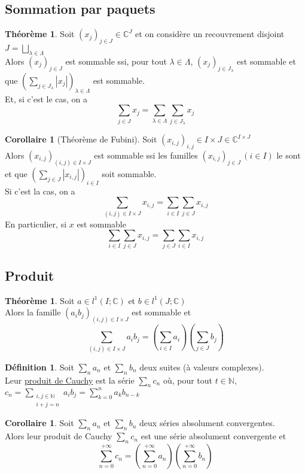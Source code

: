 \documentclass[10pt,a4paper]{article}
\theoremstyle{definition}
\newtheorem{theorem}[proposition]{Théorème}
\newtheorem{corollaire}[proposition]{Corollaire}
\newtheorem{definition}[proposition]{Définition}
\begin{document}
\subsection{Sommation par paquets}
\begin{theorem}
Soit $(x_j)_{j \in J} \in \mathbb{C}^J$ et on considère un recouvrement disjoint $J = \bigsqcup\limits_{\lambda \in \Lambda}$ \\
Alors $(x_j)_{j \in J}$ est sommable ssi, pour tout $\lambda \in \Lambda$, $(x_j)_{j \in J_\lambda}$ est sommable et que $(\sum\limits_{j \in J_\lambda} \left| x_j \right|)_{\lambda \in \Lambda}$ est sommable. \\
Et, si c'est le cas, on a
\[ \sum_{j \in J} x_j = \sum_{\lambda \in \Lambda} \sum_{j \in J_\lambda} x_j\]
\end{theorem}
\begin{corollaire}[Théorème de Fubini]
Soit $(x_{i, j})_{i, j} \in I \times J \in \mathbb{C}^{I \times J}$ \\
Alors $(x_{i, j})_{(i, j) \in I \times J}$ est sommable ssi les familles $(x_{i, j})_{j \in J} \, (i \in I)$ le sont et que $(\sum\limits_{j \in J} \left| x_{i, j} \right|)_{i \in I}$ soit sommable. \\
Si c'est la cas, on a
\[\sum_{(i, j) \in I \times J} x_{i, j} = \sum_{i \in I} \sum_{j \in J} x_{i, j}\]
En particulier, si $x$ est sommable
\[ \sum_{i \in I} \sum_{j \in J} x_{i, j} = \sum_{j \in J} \sum_{i \in I} x_{i, j}\]
\end{corollaire}

\subsection{Produit}
\begin{theorem}
Soit $a \in l^1(I; \mathbb{C})$ et $b \in l^1(J; \mathbb{C})$ \\
Alors la famille $(a_i b_j)_{(i, j) \in I \times J}$ est sommable et
\[\sum_{(i, j) \in I \times J} a_i b_j = \left(\sum_{i \in I} a_i \right) \left(\sum_{j \in J} b_j\right)\]
\end{theorem}
\begin{definition}
Soit $\sum\limits_n a_n$ et $\sum\limits_n b_n$ deux suites (à valeurs complexes). \\
Leur \uline{produit de Cauchy} est la série $\sum\limits_n c_n$ où, pour tout $t \in \mathbb{N}$, $c_n = \sum\limits_{\substack{i, j \in \mathbb{N} \\ i + j = n}} a_i b_j = \sum\limits_{k = 0}^n a_k b_{n - k}$
\end{definition}
\begin{corollaire}
Soit $\sum\limits_n a_n$ et $\sum\limits_n b_n$ deux séries absolument convergentes. \\
Alors leur produit de Cauchy $\sum\limits_n c_n$ est une série absolument convergente et
\[\sum_{n = 0}^{+\infty} c_n = \left( \sum_{n = 0}^{+\infty} a_n \right) \left( \sum_{n = 0}^{+\infty} b_n \right)\]
\end{corollaire}
\end{document}
